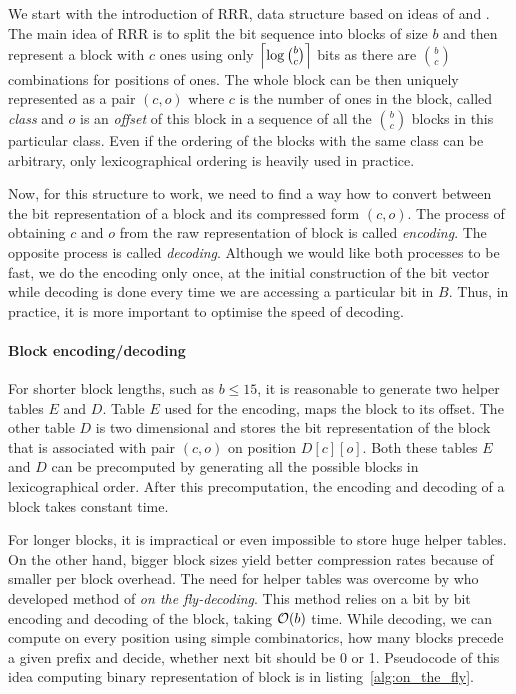 We start with the introduction of RRR, data structure based on ideas of \cite{pagh2001low} and
\cite{raman2007succinct}. The main idea of RRR is to split the bit sequence into blocks of size
$b$ and then represent a block with $c$ ones using only $\left\lceil \log {b \choose c} \right\rceil$ bits as
there are ${b \choose c}$ combinations for positions of ones. The whole block can be then uniquely
represented as a pair $(c, o)$ where $c$ is the number of ones in the block, called \emph{class} and
$o$ is an \emph{offset} of this block in a sequence of all the ${b \choose c}$ blocks in this particular class.
Even if the ordering of the blocks with the same class can be arbitrary, only lexicographical ordering
is heavily used in practice.

Now, for this structure to work, we need to find a way how to convert between the bit representation of
a block and its compressed form $(c, o)$. The process of obtaining $c$ and $o$ from the raw representation
of block is called \textit{encoding}. The opposite process is called \textit{decoding}. Although
we would like both processes to be fast, we do the encoding only once, at the initial construction
of the bit vector while decoding is done every time we are accessing a particular bit in $B$. Thus,
in practice, it is more important to optimise the speed of decoding.

\paragraph{Block encoding/decoding}

For shorter block lengths, such as $b\leq 15$, it is reasonable to generate two helper tables $E$ and $D$.
Table $E$ used for the encoding, maps the block to its offset. The other table $D$ is two dimensional and
stores the bit representation of the block that is associated with pair $(c, o)$ on position $D[c][o]$.
Both these tables $E$ and $D$ can be precomputed by generating all the possible blocks in lexicographical
order. After this precomputation, the encoding and decoding of a block takes constant time.

For longer blocks, it is impractical or even impossible to store huge helper tables. On the other
hand, bigger block sizes yield better compression rates because of smaller per block overhead. The need for
helper tables was overcome by \cite{navarro2012fast} who developed method of \textit{on the fly-decoding}.
This method relies on a bit by bit encoding and decoding of the block, taking $\mathcal{O}(b)$ time. While decoding,
we can compute on every position using simple combinatorics, how many blocks precede a given prefix and decide,
whether next bit should be 0 or 1. Pseudocode of this idea computing binary representation of block is in
listing~\ref{alg:on_the_fly}.

